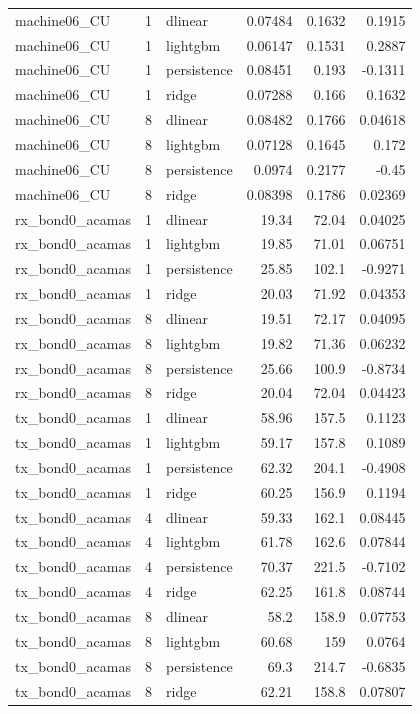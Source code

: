 \begin{table}
\begin{tabular}{lrlrrr}
machine06_CU & 1 & dlinear & 0.07484 & 0.1632 & 0.1915 \\
machine06_CU & 1 & lightgbm & 0.06147 & 0.1531 & 0.2887 \\
machine06_CU & 1 & persistence & 0.08451 & 0.193 & -0.1311 \\
machine06_CU & 1 & ridge & 0.07288 & 0.166 & 0.1632 \\
machine06_CU & 8 & dlinear & 0.08482 & 0.1766 & 0.04618 \\
machine06_CU & 8 & lightgbm & 0.07128 & 0.1645 & 0.172 \\
machine06_CU & 8 & persistence & 0.0974 & 0.2177 & -0.45 \\
machine06_CU & 8 & ridge & 0.08398 & 0.1786 & 0.02369 \\
rx_bond0_acamas & 1 & dlinear & 19.34 & 72.04 & 0.04025 \\
rx_bond0_acamas & 1 & lightgbm & 19.85 & 71.01 & 0.06751 \\
rx_bond0_acamas & 1 & persistence & 25.85 & 102.1 & -0.9271 \\
rx_bond0_acamas & 1 & ridge & 20.03 & 71.92 & 0.04353 \\
rx_bond0_acamas & 8 & dlinear & 19.51 & 72.17 & 0.04095 \\
rx_bond0_acamas & 8 & lightgbm & 19.82 & 71.36 & 0.06232 \\
rx_bond0_acamas & 8 & persistence & 25.66 & 100.9 & -0.8734 \\
rx_bond0_acamas & 8 & ridge & 20.04 & 72.04 & 0.04423 \\
tx_bond0_acamas & 1 & dlinear & 58.96 & 157.5 & 0.1123 \\
tx_bond0_acamas & 1 & lightgbm & 59.17 & 157.8 & 0.1089 \\
tx_bond0_acamas & 1 & persistence & 62.32 & 204.1 & -0.4908 \\
tx_bond0_acamas & 1 & ridge & 60.25 & 156.9 & 0.1194 \\
tx_bond0_acamas & 4 & dlinear & 59.33 & 162.1 & 0.08445 \\
tx_bond0_acamas & 4 & lightgbm & 61.78 & 162.6 & 0.07844 \\
tx_bond0_acamas & 4 & persistence & 70.37 & 221.5 & -0.7102 \\
tx_bond0_acamas & 4 & ridge & 62.25 & 161.8 & 0.08744 \\
tx_bond0_acamas & 8 & dlinear & 58.2 & 158.9 & 0.07753 \\
tx_bond0_acamas & 8 & lightgbm & 60.68 & 159 & 0.0764 \\
tx_bond0_acamas & 8 & persistence & 69.3 & 214.7 & -0.6835 \\
tx_bond0_acamas & 8 & ridge & 62.21 & 158.8 & 0.07807 \\
\bottomrule
\end{tabular}
\end{table}
